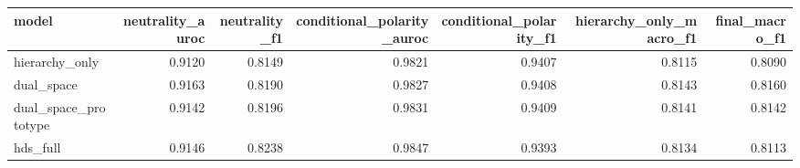 \begin{tabular}{lrrrrrr}
\toprule
model & neutrality\_auroc & neutrality\_f1 & conditional\_polarity\_auroc & conditional\_polarity\_f1 & hierarchy\_only\_macro\_f1 & final\_macro\_f1 \\
\midrule
hierarchy\_only & 0.9120 & 0.8149 & 0.9821 & 0.9407 & 0.8115 & 0.8090 \\
dual\_space & 0.9163 & 0.8190 & 0.9827 & 0.9408 & 0.8143 & 0.8160 \\
dual\_space\_prototype & 0.9142 & 0.8196 & 0.9831 & 0.9409 & 0.8141 & 0.8142 \\
hds\_full & 0.9146 & 0.8238 & 0.9847 & 0.9393 & 0.8134 & 0.8113 \\
\bottomrule
\end{tabular}
